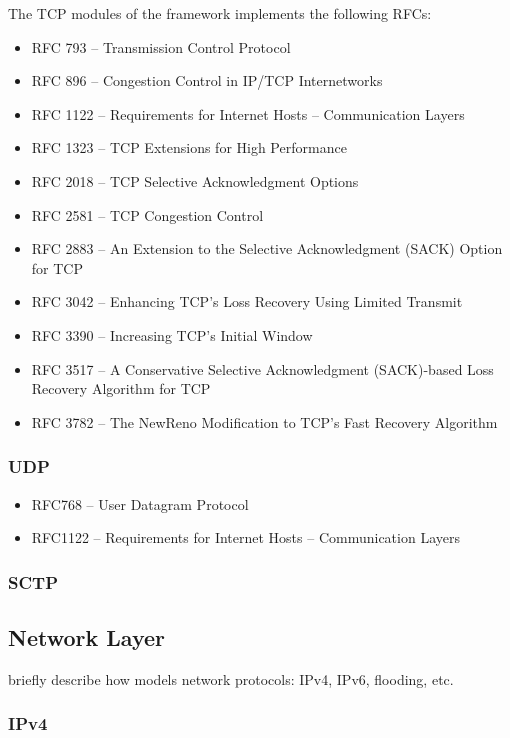 The TCP modules of the \inet framework implements the following RFCs:
\begin{itemize}
	\item RFC 793 -- Transmission Control Protocol
	\item RFC 896 -- Congestion Control in IP/TCP Internetworks
	\item RFC 1122 -- Requirements for Internet Hosts -- Communication Layers
	\item RFC 1323 -- TCP Extensions for High Performance
	\item RFC 2018 -- TCP Selective Acknowledgment Options
	\item RFC 2581 -- TCP Congestion Control
	\item RFC 2883 -- An Extension to the Selective Acknowledgment (SACK) Option for TCP
	\item RFC 3042 -- Enhancing TCP's Loss Recovery Using Limited Transmit
	\item RFC 3390 -- Increasing TCP's Initial Window
	\item RFC 3517 -- A Conservative Selective Acknowledgment (SACK)-based Loss Recovery Algorithm for TCP
	\item RFC 3782 -- The NewReno Modification to TCP's Fast Recovery Algorithm
\end{itemize}

%
\subsubsection*{UDP}
%

\begin{itemize}
	\item RFC768 -- User Datagram Protocol
	\item RFC1122 -- Requirements for Internet Hosts – Communication Layers
\end{itemize}

%
\subsubsection*{SCTP}
%

%
\subsection{Network Layer}
%
briefly describe how \inet models network protocols: IPv4, IPv6, flooding, etc.

%
\subsubsection*{IPv4}
%

